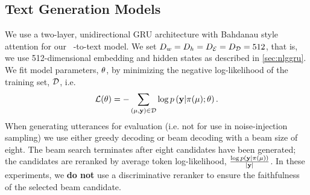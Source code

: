 \subsection{Text Generation Models}

We use a two-layer, unidirectional GRU architecture with Bahdanau style
attention for our 
 \sequencetosequence~\meaningrepresentation-to-text model. We set $D_{w} = D_{h} = {D_\mathcal{E}} = {D_\mathcal{D}} = 512$, that is, we use 512-dimensional embedding and hidden states as 
described in \autoref{sec:nlggru}.
We fit model parameters, $\theta$, by minimizing the negative log-likelihood
of the training set, $\mathcal{D}$, i.e. \[\mathcal{L}(\theta) = - \sum_{(\mu, \mathbf{y}) \in \mathcal{D}  }  \log p\left(\mathbf{y}|\pi(\mu);\theta\right).\]
When generating utterances for evaluation (i.e. not for use in noise-injection sampling) we use either greedy decoding or beam decoding with a 
beam size of eight.
The beam search terminates after eight candidates have been generated;
the candidates are reranked by average token log-likelihood, $\frac{\log p\left(\mathbf{y}|\pi(\mu)\right)}{{\left\vert \mathbf{y} \right\vert}}$. In these experiments, we \textbf{do not} use a discriminative reranker to ensure the faithfulness of the 
selected beam candidate. 


